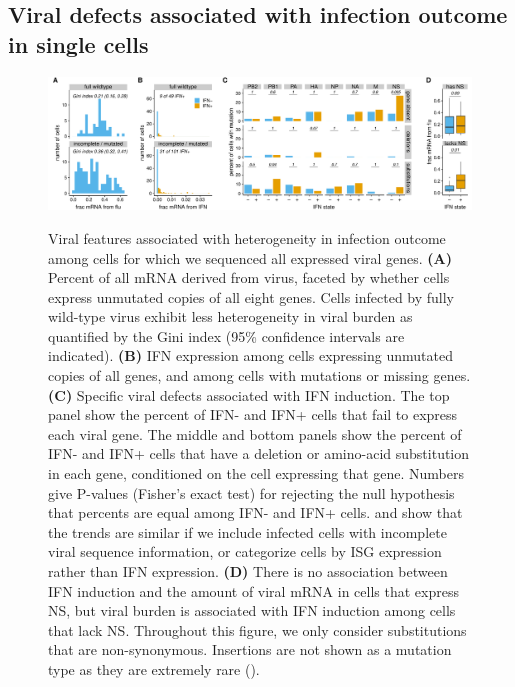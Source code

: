 \documentclass[9pt,lineno]{template}
\begin{document}
\subsection{Viral defects associated with infection outcome in single cells}

\begin{figure}
\begin{fullwidth}
{\centering
\includegraphics[width=\linewidth]{figures/single_cell_figures/p_mutations.pdf}
}
\caption{
Viral features associated with heterogeneity in infection outcome among cells for which we sequenced all expressed viral genes.
{\bf (A)} 
Percent of all mRNA derived from virus, faceted by whether cells express unmutated copies of all eight genes.
Cells infected by fully wild-type virus exhibit less heterogeneity in viral burden as quantified by the Gini index (95\% confidence intervals are indicated).
{\bf (B)}
IFN expression among cells expressing unmutated copies of all genes, and among cells with mutations or missing genes.
{\bf (C)}
Specific viral defects associated with IFN induction.
The top panel show the percent of IFN- and IFN+ cells that fail to express each viral gene.
The middle and bottom panels show the percent of IFN- and IFN+ cells that have a deletion or amino-acid substitution in each gene, conditioned on the cell expressing that gene.
Numbers give P-values (Fisher's exact test) for rejecting the null hypothesis that percents are equal among IFN- and IFN+ cells. 
 and  show that the trends are similar if we include infected cells with incomplete viral sequence information, or categorize cells by ISG expression rather than IFN expression.
{\bf (D)}
There is no association between IFN induction and the amount of viral mRNA in cells that express NS, but viral burden is associated with IFN induction among cells that lack NS.
Throughout this figure, we only consider substitutions that are non-synonymous.
Insertions are not shown as a mutation type as they are extremely rare ().
}
\label{fig:mutations}


\end{fullwidth}
\end{figure}
\end{document}

